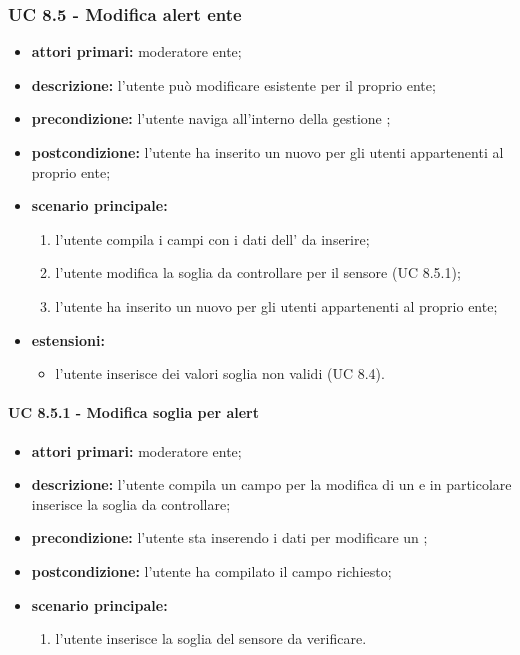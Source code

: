 			\subsubsection{UC 8.5 - Modifica alert ente}
			\begin{itemize}
				\item \textbf{attori primari:} moderatore ente;
				\item \textbf{descrizione:} l'utente può modificare  esistente per il proprio ente;
				\item \textbf{precondizione:} l'utente naviga all'interno della gestione ;
				\item \textbf{postcondizione:} l'utente ha inserito un nuovo  per gli utenti appartenenti al proprio ente;
				\item \textbf{scenario principale:}
				\begin{enumerate}
					\item{l'utente compila i campi con i dati dell' da inserire;}
					\item l'utente modifica la soglia da controllare per il sensore (UC 8.5.1);
					\item{l'utente ha inserito un nuovo  per gli utenti appartenenti al proprio ente;}
				\end{enumerate}
				\item \textbf{estensioni:}
				\begin{itemize}
					\item l'utente inserisce dei valori soglia non validi (UC 8.4).
				\end{itemize}
			\end{itemize}

				\paragraph{UC 8.5.1 - Modifica soglia per alert}
				\begin{itemize}
					\item \textbf{attori primari:} moderatore ente;
					\item \textbf{descrizione:} l'utente compila un campo per la modifica di un  e in particolare inserisce la soglia da controllare;
					\item \textbf{precondizione:} l'utente sta inserendo i dati per modificare un ;
					\item \textbf{postcondizione:} l'utente ha compilato il campo richiesto;
					\item \textbf{scenario principale:}
					\begin{enumerate}
						\item{l'utente inserisce la soglia del sensore da verificare.}
					\end{enumerate}
				\end{itemize}
